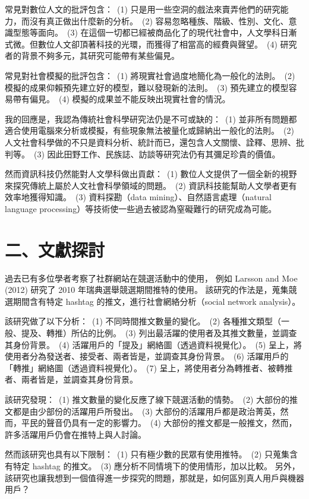 \documentclass[a4paper, 10pt, conference]{ieeeconf}       %
\begin{document}
\begin{CJK}{UTF8}{bsmi}
常見對數位人文的批評包含：%
\,(1) 只是用一些空洞的戲法來賣弄他們的研究能力，而沒有真正做出什麼新的分析。%
\,(2) 容易忽略種族、階級、性別、文化、意識型態等面向。%
\,(3) 在這個一切都已經被商品化了的現代社會中，人文學科日漸式微。但數位人文卻頂著科技的光環，而獲得了相當高的經費與聲望。%
\,(4) 研究者的背景不夠多元，其研究可能帶有某些偏見。%

常見對社會模擬的批評包含：%
\,(1) 將現實社會過度地簡化為一般化的法則。%
\,(2) 模擬的成果仰賴預先建立好的模型，難以發現新的法則。%
\,(3) 預先建立的模型容易帶有偏見。%
\,(4) 模擬的成果並不能反映出現實社會的情況。%

我的回應是，我認為傳統社會科學研究法仍是不可或缺的：%
\,(1) 並非所有問題都適合使用電腦來分析或模擬，有些現象無法被量化或歸納出一般化的法則。%
\,(2) 人文社會科學做的不只是資料分析、統計而已，還包含人文關懷、詮釋、思辨、批判等。%
\,(3) 因此田野工作、民族誌、訪談等研究法仍有其彌足珍貴的價值。%

然而資訊科技仍然能對人文學科做出貢獻：%
\,(1) 數位人文提供了一個全新的視野來探究傳統上屬於人文社會科學領域的問題。%
\,(2) 資訊科技能幫助人文學者更有效率地獲得知識。%
\,(3) 資料探勘（data mining）、自然語言處理（natural language processing）等技術使一些過去被認為窒礙難行的研究成為可能。%

\section*{二、文獻探討}

過去已有多位學者考察了社群網站在競選活動中的使用，%
例如 Larsson and Moe (2012) 研究了 2010 年瑞典選舉競選期間推特的使用。\cite{c1} %
該研究的作法是，蒐集競選期間含有特定 hashtag 的推文，進行社會網絡分析（social network analysis）。%

該研究做了以下分析：%
\,(1) 不同時間推文數量的變化。%
\,(2) 各種推文類型（一般、提及、轉推）所佔的比例。%
\,(3) 列出最活躍的使用者及其推文數量，並調查其身份背景。%
\,(4) 活躍用戶的「提及」網絡圖（透過資料視覺化）。%
\,(5) 呈上，將使用者分為發送者、接受者、兩者皆是，並調查其身份背景。%
\,(6) 活躍用戶的「轉推」網絡圖（透過資料視覺化）。%
\,(7) 呈上，將使用者分為轉推者、被轉推者、兩者皆是，並調查其身份背景。%

該研究發現：%
\,(1) 推文數量的變化反應了線下競選活動的情勢。%
\,(2) 大部份的推文都是由少部份的活躍用戶所發出。%
\,(3) 大部份的活躍用戶都是政治菁英，然而，平民的聲音仍具有一定的影響力。%
\,(4) 大部份的推文都是一般推文，然而，許多活躍用戶仍會在推特上與人討論。%

然而該研究也具有以下限制：%
\,(1) 只有極少數的民眾有使用推特。%
\,(2) 只蒐集含有特定 hashtag 的推文。%
\,(3) 應分析不同情境下的使用情形，加以比較。%
另外，該研究也讓我想到一個值得進一步探究的問題，那就是，如何區別真人用戶與機器用戶？%


\end{CJK}
\end{document}
